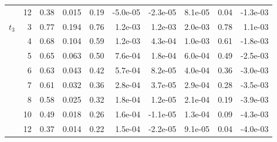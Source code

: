 \begin{table}
\begin{tabular}{lrrrrrrrrr}
 & 12 & 0.38 & 0.015 & 0.19 & -5.0e-05 & -2.3e-05 & 8.1e-05 & 0.04 & -1.3e-03 \\
$t_3$ & 3 & 0.77 & 0.194 & 0.76 & 1.2e-03 & 1.2e-03 & 2.0e-03 & 0.78 & 1.1e-03 \\
 & 4 & 0.68 & 0.104 & 0.59 & 1.2e-03 & 4.3e-04 & 1.0e-03 & 0.61 & -1.8e-03 \\
 & 5 & 0.65 & 0.063 & 0.50 & 7.6e-04 & 1.8e-04 & 6.0e-04 & 0.49 & -2.5e-03 \\
 & 6 & 0.63 & 0.043 & 0.42 & 5.7e-04 & 8.2e-05 & 4.0e-04 & 0.36 & -3.0e-03 \\
 & 7 & 0.61 & 0.032 & 0.36 & 2.8e-04 & 3.7e-05 & 2.9e-04 & 0.28 & -3.5e-03 \\
 & 8 & 0.58 & 0.025 & 0.32 & 1.8e-04 & 1.2e-05 & 2.1e-04 & 0.19 & -3.9e-03 \\
 & 10 & 0.49 & 0.018 & 0.26 & 1.6e-04 & -1.1e-05 & 1.3e-04 & 0.09 & -4.3e-03 \\
 & 12 & 0.37 & 0.014 & 0.22 & 1.5e-04 & -2.2e-05 & 9.1e-05 & 0.04 & -4.0e-03 \\
\bottomrule
\end{tabular}
\end{table}

